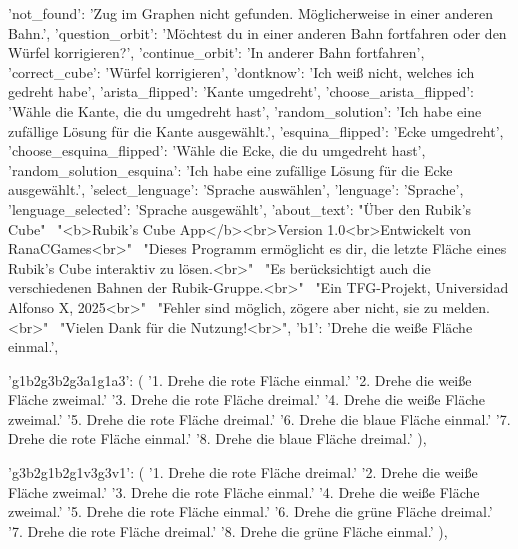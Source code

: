 {{        'not_found':       'Zug im Graphen nicht gefunden. Möglicherweise in einer anderen Bahn.',
        'question_orbit':  'Möchtest du in einer anderen Bahn fortfahren oder den Würfel korrigieren?',
        'continue_orbit':  'In anderer Bahn fortfahren',
        'correct_cube':    'Würfel korrigieren',
        'dontknow':        'Ich weiß nicht, welches ich gedreht habe',
        'arista_flipped':  'Kante umgedreht',
        'choose_arista_flipped': 'Wähle die Kante, die du umgedreht hast',
        'random_solution': 'Ich habe eine zufällige Lösung für die Kante ausgewählt.',
        'esquina_flipped': 'Ecke umgedreht',
        'choose_esquina_flipped': 'Wähle die Ecke, die du umgedreht hast',
        'random_solution_esquina': 'Ich habe eine zufällige Lösung für die Ecke ausgewählt.',
        'select_lenguage': 'Sprache auswählen',
        'lenguage':        'Sprache',
        'lenguage_selected': 'Sprache ausgewählt',
        'about_text':      "Über den Rubik's Cube" \
                            "<b>Rubik's Cube App</b><br>Version 1.0<br>Entwickelt von RanaCGames<br>" \
                            "Dieses Programm ermöglicht es dir, die letzte Fläche eines Rubik's Cube interaktiv zu lösen.<br>" \
                            "Es berücksichtigt auch die verschiedenen Bahnen der Rubik-Gruppe.<br>" \
                            "Ein TFG-Projekt, Universidad Alfonso X, 2025<br>" \
                            "Fehler sind möglich, zögere aber nicht, sie zu melden.<br>" \
                            "Vielen Dank für die Nutzung!<br>",
        'b1': 'Drehe die weiße Fläche einmal.',

        'g1b2g3b2g3a1g1a3': (
            '1. Drehe die rote Fläche einmal.\n'
            '2. Drehe die weiße Fläche zweimal.\n'
            '3. Drehe die rote Fläche dreimal.\n'
            '4. Drehe die weiße Fläche zweimal.\n'
            '5. Drehe die rote Fläche dreimal.\n'
            '6. Drehe die blaue Fläche einmal.\n'
            '7. Drehe die rote Fläche einmal.\n'
            '8. Drehe die blaue Fläche dreimal.'
        ),

        'g3b2g1b2g1v3g3v1': (
            '1. Drehe die rote Fläche dreimal.\n'
            '2. Drehe die weiße Fläche zweimal.\n'
            '3. Drehe die rote Fläche einmal.\n'
            '4. Drehe die weiße Fläche zweimal.\n'
            '5. Drehe die rote Fläche einmal.\n'
            '6. Drehe die grüne Fläche dreimal.\n'
            '7. Drehe die rote Fläche dreimal.\n'
            '8. Drehe die grüne Fläche einmal.'
        ),

}}
